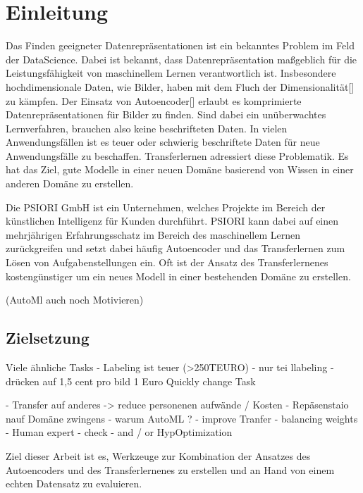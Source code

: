 \listoftodos

\chapter{Einleitung}
\label{chap:Einleitung}
	Das Finden geeigneter Datenrepräsentationen ist ein bekanntes Problem im Feld der DataScience. Dabei ist bekannt, dass Datenrepräsentation maßgeblich für die Leistungsfähigkeit von maschinellem Lernen verantwortlich ist. Insbesondere hochdimensionale Daten, wie Bilder, haben mit dem Fluch der Dimensionalität[] zu kämpfen. Der Einsatz von Autoencoder[] erlaubt es komprimierte Datenrepräsentationen für Bilder zu finden. Sind dabei ein unüberwachtes Lernverfahren, brauchen also keine beschrifteten Daten.
	In vielen Anwendungsfällen ist es teuer oder schwierig beschriftete Daten für neue Anwendungsfälle zu beschaffen. Transferlernen adressiert diese Problematik. Es hat das Ziel, gute Modelle in einer neuen Domäne basierend von Wissen in einer anderen Domäne zu erstellen.
	
	Die PSIORI GmbH \cite{PSIORIGmbH.2020} ist ein Unternehmen, welches Projekte im Bereich der künstlichen Intelligenz für Kunden durchführt. PSIORI kann dabei auf einen mehrjährigen Erfahrungsschatz im Bereich des maschinellem Lernen zurückgreifen und setzt dabei häufig Autoencoder und das Transferlernen zum Lösen von Aufgabenstellungen ein. Oft ist der Ansatz des Transferlernenes kostengünstiger um ein neues Modell in einer bestehenden Domäne zu erstellen. 

 	(AutoMl auch noch Motivieren)

	\section{Zielsetzung}
	\label{sec:Zielsetzung}
	
	Viele ähnliche Tasks
		- Labeling ist teuer (>250TEURO)
			- nur tei llabeling
			- drücken auf 1,5 cent pro bild 1 Euro
			Quickly change Task
			
		- Transfer auf anderes -> reduce personenen aufwände / Kosten
		- Repäsenstaio nauf Domäne zwingens
		- warum AutoML ?
			- improve Tranfer
			- balancing weights
			- Human expert 
				- check
				 - and / or HypOptimization
	
	Ziel dieser Arbeit ist es, Werkzeuge zur Kombination der Ansatzes des Autoencoders und des Transferlernenes zu erstellen und an Hand von einem echten Datensatz zu evaluieren.
